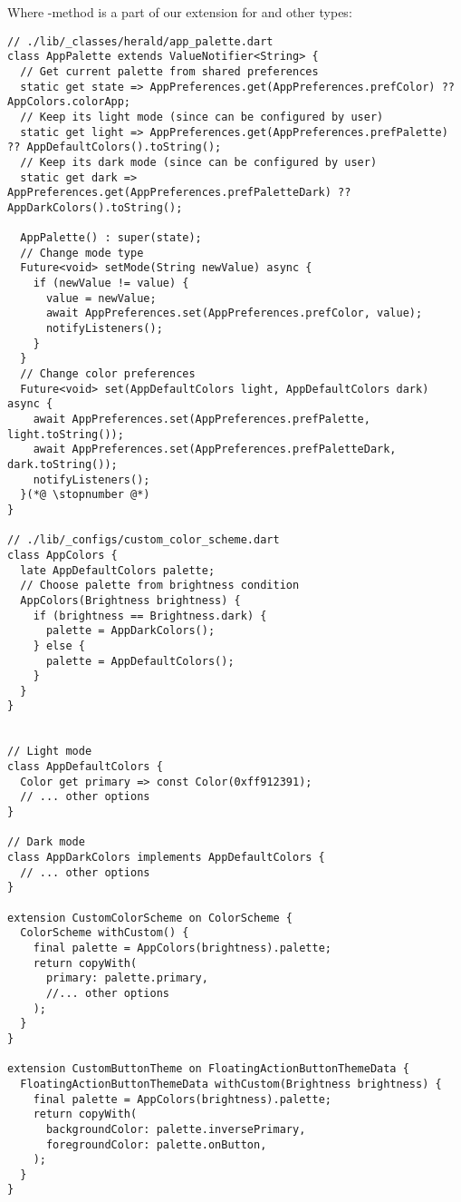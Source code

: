 \noindent Where -method is a part of our extension for  and other types:

\begin{lstlisting}
// ./lib/_classes/herald/app_palette.dart
class AppPalette extends ValueNotifier<String> {
  // Get current palette from shared preferences
  static get state => AppPreferences.get(AppPreferences.prefColor) ?? AppColors.colorApp;
  // Keep its light mode (since can be configured by user)
  static get light => AppPreferences.get(AppPreferences.prefPalette) ?? AppDefaultColors().toString();
  // Keep its dark mode (since can be configured by user)
  static get dark => AppPreferences.get(AppPreferences.prefPaletteDark) ?? AppDarkColors().toString();

  AppPalette() : super(state);
  // Change mode type
  Future<void> setMode(String newValue) async {
    if (newValue != value) {
      value = newValue;
      await AppPreferences.set(AppPreferences.prefColor, value);
      notifyListeners();
    }
  }
  // Change color preferences
  Future<void> set(AppDefaultColors light, AppDefaultColors dark) async {
    await AppPreferences.set(AppPreferences.prefPalette, light.toString());
    await AppPreferences.set(AppPreferences.prefPaletteDark, dark.toString());
    notifyListeners();
  }(*@ \stopnumber @*)
}

// ./lib/_configs/custom_color_scheme.dart
class AppColors {
  late AppDefaultColors palette;
  // Choose palette from brightness condition
  AppColors(Brightness brightness) {
    if (brightness == Brightness.dark) {
      palette = AppDarkColors();
    } else {
      palette = AppDefaultColors();
    }
  }
}


// Light mode
class AppDefaultColors {
  Color get primary => const Color(0xff912391);
  // ... other options
}

// Dark mode
class AppDarkColors implements AppDefaultColors {
  // ... other options
}

extension CustomColorScheme on ColorScheme {
  ColorScheme withCustom() {
    final palette = AppColors(brightness).palette;
    return copyWith(
      primary: palette.primary,
      //... other options
    );
  }
}

extension CustomButtonTheme on FloatingActionButtonThemeData {
  FloatingActionButtonThemeData withCustom(Brightness brightness) {
    final palette = AppColors(brightness).palette;
    return copyWith(
      backgroundColor: palette.inversePrimary,
      foregroundColor: palette.onButton,
    );
  }
}
\end{lstlisting}


